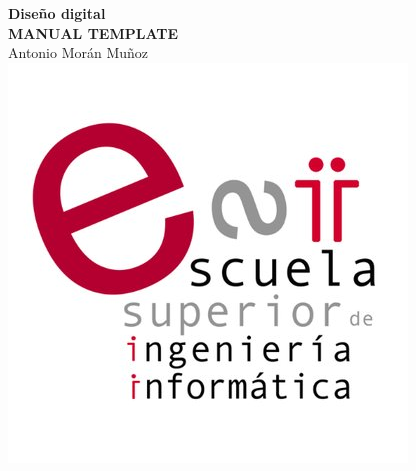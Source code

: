 \begin{titlepage}
\begin{flushright}
\LARGE{\textbf{Diseño digital}}\\
\vfill
\Huge{\textbf{MANUAL TEMPLATE}}\\
    \vfill
    \large Antonio Morán Muñoz\\
\vfill
\includegraphics[width=0.3\linewidth]{figs/esiiab-logo.jpg}\\ 
 
\end{flushright}
\end{titlepage}


